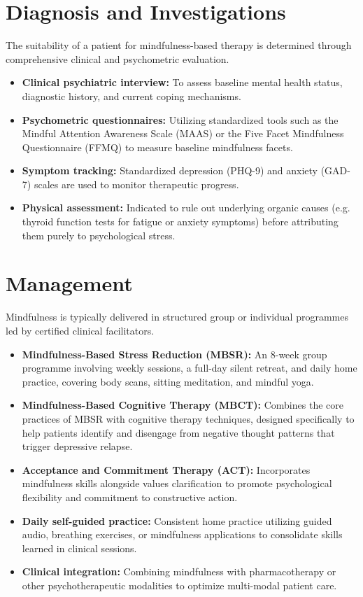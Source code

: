 \section*{Diagnosis and Investigations}
The suitability of a patient for mindfulness-based therapy is determined through comprehensive clinical and psychometric evaluation.
\begin{itemize}
    \item \textbf{Clinical psychiatric interview:} To assess baseline mental health status, diagnostic history, and current coping mechanisms.
    \item \textbf{Psychometric questionnaires:} Utilizing standardized tools such as the Mindful Attention Awareness Scale (MAAS) or the Five Facet Mindfulness Questionnaire (FFMQ) to measure baseline mindfulness facets.
    \item \textbf{Symptom tracking:} Standardized depression (PHQ-9) and anxiety (GAD-7) scales are used to monitor therapeutic progress.
    \item \textbf{Physical assessment:} Indicated to rule out underlying organic causes (e.g. thyroid function tests for fatigue or anxiety symptoms) before attributing them purely to psychological stress.
\end{itemize}

\section*{Management}
Mindfulness is typically delivered in structured group or individual programmes led by certified clinical facilitators.
\begin{itemize}
    \item \textbf{Mindfulness-Based Stress Reduction (MBSR):} An 8-week group programme involving weekly sessions, a full-day silent retreat, and daily home practice, covering body scans, sitting meditation, and mindful yoga.
    \item \textbf{Mindfulness-Based Cognitive Therapy (MBCT):} Combines the core practices of MBSR with cognitive therapy techniques, designed specifically to help patients identify and disengage from negative thought patterns that trigger depressive relapse.
    \item \textbf{Acceptance and Commitment Therapy (ACT):} Incorporates mindfulness skills alongside values clarification to promote psychological flexibility and commitment to constructive action.
    \item \textbf{Daily self-guided practice:} Consistent home practice utilizing guided audio, breathing exercises, or mindfulness applications to consolidate skills learned in clinical sessions.
    \item \textbf{Clinical integration:} Combining mindfulness with pharmacotherapy or other psychotherapeutic modalities to optimize multi-modal patient care.
\end{itemize}

